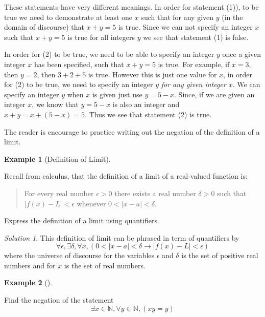 \documentclass[
  letterpaper,
  10pt,
  reqno,
  twopage,
  openany]{book}
\theoremstyle{plain}
\theoremstyle{definition}
\theoremstyle{definition}
\theoremstyle{definition}
\newtheorem{example}{Example}[chapter]
\theoremstyle{plain}
\theoremstyle{plain}
\theoremstyle{remark}
\newtheorem*{solution}{Solution}
\begin{document}
These statements have very different meanings. In order for statement
(1)), to be true we need to demonstrate at least one \(x\) such that for
any given \(y\) (in the domain of discourse) that \(x+y=5\) is true.
Since we can not specify an integer \(x\) such that \(x+y=5\) is true
for all integers \(y\) we see that statement (1) is false.

In order for (2) to be true, we need to be able to specify an integer
\(y\) once a given integer \(x\) has been specified, such that \(x+y=5\)
is true. For example, if \(x=3\), then \(y=2\), then \(3+2+5\) is true.
However this is just one value for \(x\), in order for (2) to be true,
we need to specify an integer \(y\) \emph{for any given integer \(x\)}.
We can specify an integer \(y\) when \(x\) is given just use \(y=5-x\).
Since, if we are given an integer \(x\), we know that \(y=5-x\) is also
an integer and \(x+y=x+(5-x)=5\). Thus we see that statement (2) is
true.

The reader is encourage to practice writing out the negation of the
definition of a limit.

\leavevmode{}%
\begin{example}[Definition of Limit]\label{exm-dl}

Recall from calculus, that the definition of a limit of a real-valued
function is:

\begin{quote}
For every real number \(\epsilon>0\) there exists a real number
\(\delta>0\) such that \(|f(x)-L|<\epsilon\) whenever
\(0<|x-a|<\delta\).
\end{quote}

Express the definition of a limit using quantifiers.

\end{example}

\begin{solution}

This definition of limit can be phrased in term of quantifiers by \[
\forall \epsilon, \exists \delta, \forall x, (0<|x-a|<\delta \rightarrow |f(x)-L|<\epsilon) 
\] where the universe of discourse for the variables \(\epsilon\) and
\(\delta\) is the set of positive real numbers and for \(x\) is the set
of real numbers.

\end{solution}

\leavevmode{}%
\begin{example}[]\label{exm-nq-2}

Find the negation of the statement \begin{equation}
\label{negformone}
\exists x\in \mathbb{N}, \forall y\in \mathbb{N}, (xy=y)
\end{equation}

\end{example}
\end{document}
